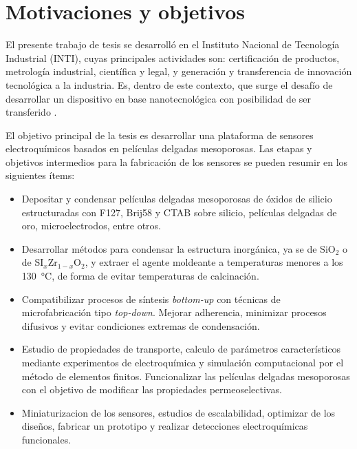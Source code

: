 				

\section{Motivaciones y objetivos}

	El presente trabajo de tesis se desarrolló en el Instituto Nacional de Tecnología Industrial (INTI), cuyas principales actividades son: certificación de productos, metrología industrial, científica y legal, y generación y transferencia	de innovación tecnológica a la industria. Es, dentro de este contexto, que surge el desafío de desarrollar un dispositivo en base nanotecnológica con posibilidad de ser transferido . 

	El objetivo principal de la tesis es desarrollar una plataforma de sensores electroquímicos basados en películas delgadas mesoporosas. Las etapas y objetivos intermedios para la fabricación de los sensores se pueden resumir en los siguientes ítems:

	\begin{itemize}
		
		\item Depositar y condensar películas delgadas mesoporosas de óxidos de silicio estructuradas con F127, Brij58 y CTAB sobre silicio, películas delgadas de oro, microelectrodos, entre otros.  
		
		\item Desarrollar métodos para condensar la estructura inorgánica, ya se de SiO$_2$ o de SI$_{x}$Zr$_{1-x}$O$_2$, y extraer el agente moldeante a temperaturas menores a los \SI{130}{\celsius}, de forma de evitar temperaturas de calcinación. 

		\item Compatibilizar procesos de síntesis \textit{bottom-up} con técnicas de microfabricación tipo \textit{top-down}. Mejorar adherencia, minimizar procesos difusivos y evitar condiciones extremas de condensación.

		\item Estudio de propiedades de transporte, calculo de parámetros característicos mediante experimentos de electroquímica y simulación computacional por el método de elementos finitos. Funcionalizar las películas delgadas mesoporosas con el objetivo de modificar las propiedades permeoselectivas.

		\item Miniaturizacion de los sensores, estudios de escalabilidad, optimizar de los diseños, fabricar un prototipo y realizar detecciones electroquímicas funcionales.

		\end{itemize}	


